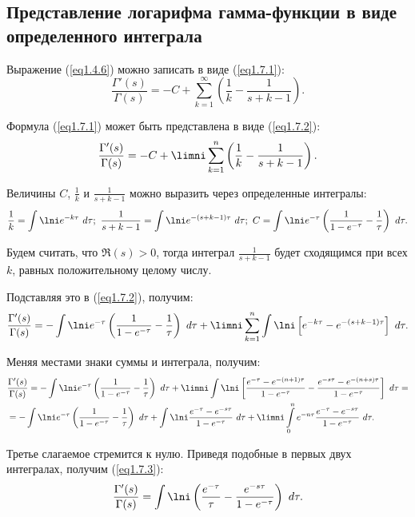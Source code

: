 \subsection{Представление логарифма гамма-функции в виде определенного интеграла}

Выражение (\ref{eq1.4.6}) можно записать в виде (\ref{eq1.7.1}):
\begin{equation}
    \frac{\Gamma'(s)}{\Gamma(s)} = -C +
    \sum\limits_{k=1}^\infty\left(\frac{1}{k} - \frac{1}{s+k-1}\right).
    \label{eq1.7.1}
\end{equation}

Формула (\ref{eq1.7.1}) может быть представлена в виде (\ref{eq1.7.2}):
\begin{equation}
    \frac{\Gamma'(s)}{\Gamma(s)} = -C +
    \limni\sum\limits_{k=1}^n \left(\frac{1}{k} - \frac{1}{s+k-1}\right).
    \label{eq1.7.2}
\end{equation}

Величины \( C \), \( \frac{1}{k} \) и \( \frac{1}{s+k-1} \) можно выразить
через определенные интегралы:
\[
    \frac{1}{k} = \int\lni e^{-k\tau}\ d\tau;\ 
    \frac{1}{s+k-1} = \int\lni e^{-(s+k-1)\tau}\ d\tau;\ 
    C =
    \int\lni e^{-\tau}\left(\frac{1}{1-e^{-\tau}}-\frac{1}{\tau}\right)\ d\tau.
\]

Будем считать, что \( \Re(s) > 0 \), тогда интеграл \( \frac{1}{s+k-1} \) будет
сходящимся при всех \( k \), равных положительному целому числу.

Подставляя это в (\ref{eq1.7.2}), получим:
\[
    \frac{\Gamma'(s)}{\Gamma(s)} =
    -\int\lni e^{-\tau}\left(\frac{1}{1-e^{-\tau}} -
    \frac{1}{\tau}\right)\ d\tau + \limni\sum\limits_{k=1}^n \int\lni
    \left[ e^{-k\tau} - e^{-(s+k-1)\tau} \right]\ d\tau.
\]

Меняя местами знаки суммы и интеграла, получим:
\begin{align*}
    & \frac{\Gamma'(s)}{\Gamma(s)} =
    -\int\lni e^{-\tau}\left(\frac{1}{1-e^{-\tau}} -
    \frac{1}{\tau}\right)\ d\tau +
    \limni\int\lni \left[ \frac{e^{-\tau} - e^{-(n+1)\tau}}{1-e^{-\tau}} -
    \frac{e^{-s\tau} - e^{-(n+s)\tau}}{1-e^{-\tau}} \right]\ d\tau = \\
    & = -\int\lni e^{-\tau}\left(\frac{1}{1-e^{-\tau}} -
    \frac{1}{\tau}\right)\ d\tau +
    \int\lni\frac{e^{-\tau} - e^{-s\tau}}{1-e^{-\tau}}\ d\tau +
    \limni\int\limits_0^ne^{-n\tau}
    \frac{e^{-\tau}-e^{-s\tau}}{1-e^{-\tau}}\ d\tau.
\end{align*}

Третье слагаемое стремится к нулю. Приведя подобные в первых двух интегралах,
получим (\ref{eq1.7.3}):
\begin{equation}
    \frac{\Gamma'(s)}{\Gamma(s)} = \int\lni \left(\frac{e^{-\tau}}{\tau} -
    \frac{e^{-s\tau}}{1-e^{-\tau}}\right)\ d\tau.
    \label{eq1.7.3}
\end{equation}

